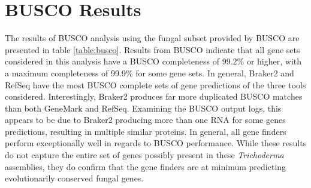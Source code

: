 \section{BUSCO Results}

The results of BUSCO analysis using the fungal subset provided by
BUSCO are presented in table \ref{table:busco}. Results from BUSCO
indicate that all gene sets considered in this analysis have a BUSCO
completeness of 99.2\% or higher, with a maximum completeness of
99.9\% for some gene sets. In general, Braker2 and RefSeq have the
most BUSCO complete sets of gene predictions of the three tools
considered. Interestingly, Braker2 produces far more duplicated BUSCO
matches than both GeneMark and RefSeq. Examining the BUSCO output
logs, this appears to be due to Braker2 producing more than one RNA
for some genes predictions, resulting in multiple similar proteins. In
general, all gene finders perform exceptionally well in regards to
BUSCO performance. While these results do not capture the entire set
of genes possibly present in these \textit{Trichoderma} assemblies,
they do confirm that the gene finders are at minimum predicting
evolutionarily conserved fungal genes.

